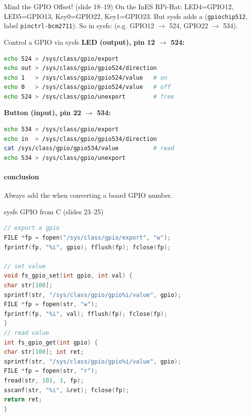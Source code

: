 \begin{corollary}{Mind the GPIO Offset! (slide 18--19)}
    On the InES RPi-Hat: LED4=GPIO12, LED5=GPIO13, Key0=GPIO22, Key1=GPIO23.
    But sysfs adds a  (\texttt{gpiochip512},
    label \texttt{pinctrl-bcm2711}). So in sysfs:
     (e.g. GPIO12 $\to$ 524, GPIO22 $\to$ 534).
\end{corollary}

\begin{KR}{Control a GPIO via sysfs}
    \textbf{LED (output), pin 12 $\to$ 524:}
\begin{lstlisting}[language=bash, style=basesmol, aboveskip=2pt, belowskip=2pt]
echo 524 > /sys/class/gpio/export
echo out > /sys/class/gpio/gpio524/direction
echo 1   > /sys/class/gpio/gpio524/value   # on
echo 0   > /sys/class/gpio/gpio524/value   # off
echo 524 > /sys/class/gpio/unexport        # free
\end{lstlisting}
    \textbf{Button (input), pin 22 $\to$ 534:}
\begin{lstlisting}[language=bash, style=basesmol, aboveskip=2pt, belowskip=2pt]
echo 534 > /sys/class/gpio/export
echo in  > /sys/class/gpio/gpio534/direction
cat /sys/class/gpio/gpio534/value          # read
echo 534 > /sys/class/gpio/unexport
\end{lstlisting}
    \paragraph{conclusion}
    Always add the  when converting a board GPIO number.
\end{KR}

\begin{examplecode}{sysfs GPIO from C (slides 23--25)}
\begin{lstlisting}[language=C, style=basesmol, aboveskip=2pt, belowskip=2pt]
// export a gpio
FILE *fp = fopen("/sys/class/gpio/export", "w");
fprintf(fp, "%i", gpio); fflush(fp); fclose(fp);

// set value
void fs_gpio_set(int gpio, int val) {
char str[100];
sprintf(str, "/sys/class/gpio/gpio%i/value", gpio);
FILE *fp = fopen(str, "w");
fprintf(fp, "%i", val); fflush(fp); fclose(fp);
}
// read value
int fs_gpio_get(int gpio) {
char str[100]; int ret;
sprintf(str, "/sys/class/gpio/gpio%i/value", gpio);
FILE *fp = fopen(str, "r");
fread(str, 101, 1, fp);
sscanf(str, "%i", &ret); fclose(fp);
return ret;
}
\end{lstlisting}
\end{examplecode}

